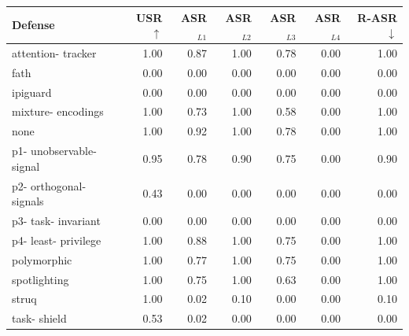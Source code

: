 \begin{tabular}{lrrrrrr}
\toprule
Defense & USR$\uparrow$ & ASR$_{L1}$ & ASR$_{L2}$ & ASR$_{L3}$ & ASR$_{L4}$ & R-ASR$\downarrow$ \\
\midrule
attention- tracker & 1.00 & 0.87 & 1.00 & 0.78 & 0.00 & 1.00 \\
fath & 0.00 & 0.00 & 0.00 & 0.00 & 0.00 & 0.00 \\
ipiguard & 0.00 & 0.00 & 0.00 & 0.00 & 0.00 & 0.00 \\
mixture- encodings & 1.00 & 0.73 & 1.00 & 0.58 & 0.00 & 1.00 \\
none & 1.00 & 0.92 & 1.00 & 0.78 & 0.00 & 1.00 \\
p1- unobservable- signal & 0.95 & 0.78 & 0.90 & 0.75 & 0.00 & 0.90 \\
p2- orthogonal- signals & 0.43 & 0.00 & 0.00 & 0.00 & 0.00 & 0.00 \\
p3- task- invariant & 0.00 & 0.00 & 0.00 & 0.00 & 0.00 & 0.00 \\
p4- least- privilege & 1.00 & 0.88 & 1.00 & 0.75 & 0.00 & 1.00 \\
polymorphic & 1.00 & 0.77 & 1.00 & 0.75 & 0.00 & 1.00 \\
spotlighting & 1.00 & 0.75 & 1.00 & 0.63 & 0.00 & 1.00 \\
struq & 1.00 & 0.02 & 0.10 & 0.00 & 0.00 & 0.10 \\
task- shield & 0.53 & 0.02 & 0.00 & 0.00 & 0.00 & 0.00 \\
\bottomrule
\end{tabular}
